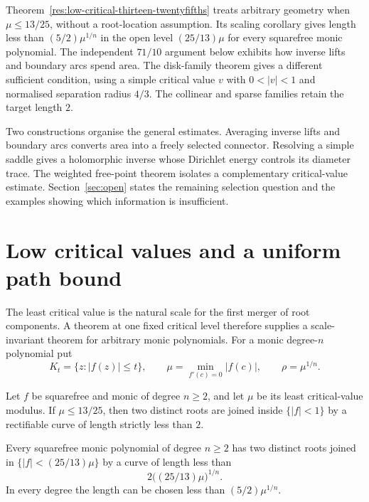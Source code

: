 \documentclass[11pt]{article}
\begin{document}
Theorem~\ref{res:low-critical-thirteen-twentyfifths} treats arbitrary geometry
when $\mu\le13/25$, without a root-location assumption.  Its scaling
corollary gives length less than $(5/2)\mu^{1/n}$ in the open level
$(25/13)\mu$ for every squarefree monic polynomial.  The independent
$71/10$ argument below exhibits how inverse lifts and boundary arcs spend
area.
The disk-family theorem gives a different sufficient condition, using a
simple critical value $v$ with $0<|v|<1$ and normalised separation radius
$4/3$.  The collinear and sparse families retain the target length $2$.

Two constructions organise the general estimates.  Averaging inverse lifts
and boundary arcs converts area into a freely selected connector.  Resolving
a simple saddle gives a holomorphic inverse whose Dirichlet energy controls
its diameter trace.  The weighted free-point theorem isolates a complementary
critical-value estimate.  Section~\ref{sec:open} states the remaining
selection question and the examples showing which information is insufficient.

\section{Low critical values and a uniform path bound}
\label{sec:constant-factor}

The least critical value is the natural scale for the first merger of root
components.  A theorem at one fixed critical level therefore supplies a
scale-invariant theorem for arbitrary monic polynomials.  For a monic
degree-$n$ polynomial put
\[
 K_t=\{z:|f(z)|\le t\},\qquad
 \mu=\min_{f'(c)=0}|f(c)|,\qquad \rho=\mu^{1/n}.
\]

\begin{theorem}
\label{res:low-critical-thirteen-twentyfifths}
Let $f$ be squarefree and monic of degree $n\ge2$, and let $\mu$ be its least
critical-value modulus.  If $\mu\le13/25$, then two distinct roots are joined
inside $\{|f|<1\}$ by a rectifiable curve of length strictly less than $2$.
\end{theorem}

\begin{corollary}
\label{res:scaled-low-critical}
Every squarefree monic polynomial of degree $n\ge2$ has two distinct roots
joined in $\{|f|<(25/13)\mu\}$ by a curve of length less than
\[
 2\bigl((25/13)\mu\bigr)^{1/n}.
\]
In every degree the length can be chosen less than $(5/2)\mu^{1/n}$.
\end{corollary}
\end{document}
